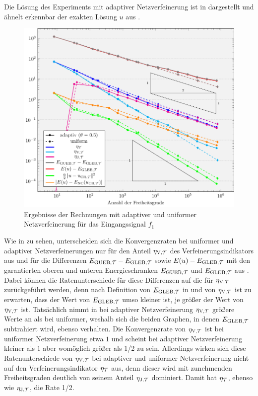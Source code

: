 Die Lösung des Experiments mit adaptiver Netzverfeinerung ist in
 dargestellt und ähnelt erkennbar der exakten Lösung
$u$ aus .
\begin{figure}[p]
  \centering
  \includegraphics[width=.8\linewidth]
    {pictures/chapExperiments/secExactSol/f01/conv.pdf}
  \caption{Ergebnisse der Rechnungen mit adaptiver und uniformer 
    Netzverfeinerung für das Eingangssignal $f_1$}
  \label{fig:f01Convergence}
\end{figure}
Wie in  zu sehen, unterscheiden sich die
Konvergenzraten bei uniformer und adaptiver Netzverfeinerungen nur für den
Anteil $\eta_{\textup{V}, \mathcal{T}}$ des Verfeinerungsindikators aus 
und für die Differenzen $E_{\textup{GUEB}, \mathcal{T}}-E_{\textup{GLEB}, \mathcal{T}}$ sowie $E(u)-E_{\textup{GLEB}, \mathcal{T}}$ mit den
garantierten oberen und unteren Energieschranken $E_{\textup{GUEB}, \mathcal{T}}$ und $E_{\textup{GLEB}, \mathcal{T}}$ aus
.
Dabei können die Ratenunterschiede für diese Differenzen auf die für $\eta_{\textup{V}, \mathcal{T}}$
zurückgeführt werden, denn nach Definition von $E_{\textup{GLEB}, \mathcal{T}}$ in 
und von $\eta_{\textup{V}, \mathcal{T}}$ ist zu erwarten, dass der Wert von $E_{\textup{GLEB}, \mathcal{T}}$ umso kleiner
ist, je größer der Wert von $\eta_{\textup{V}, \mathcal{T}}$ ist. 
Tatsächlich nimmt in  bei adaptiver Netzverfeinerung 
$\eta_{\textup{V}, \mathcal{T}}$ größere Werte an als bei uniformer, weshalb sich die beiden Graphen, in
denen $E_{\textup{GLEB}, \mathcal{T}}$ subtrahiert wird, ebenso verhalten.
Die Konvergenzrate von $\eta_{\textup{V}, \mathcal{T}}$ ist bei uniformer Netzverfeinerung etwa $1$ und
scheint bei adaptiver Netzverfeinerung kleiner als $1$ aber womöglich
größer als 1/2 zu sein.  
Allerdings wirken sich diese Ratenunterschiede von $\eta_{\textup{V}, \mathcal{T}}$ bei adaptiver und
uniformer Netzverfeinerung nicht auf den Verfeinerungsindikator $\eta_{\mathcal{T}}$ aus,
denn dieser wird mit zunehmenden Freiheitsgraden deutlich von seinem Anteil
$\eta_{\textup{J}, \mathcal{T}}$ dominiert.
Damit hat $\eta_{\mathcal{T}}$, ebenso wie $\eta_{\textup{J}, \mathcal{T}}$, die Rate 1/2.

